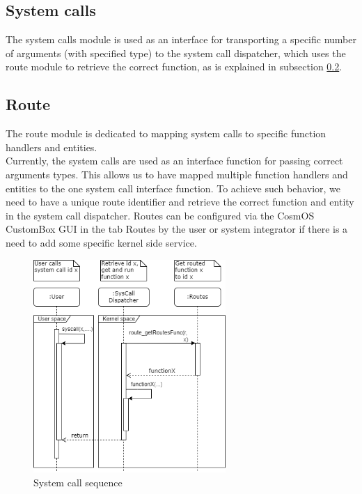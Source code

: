 \subsection{System calls}
The system calls module is used as an interface for transporting a specific number of arguments (with specified type) to the system call dispatcher, which uses the route module to retrieve the correct function, as is explained in subsection \ref{Route}.

\subsection{Route}\label{Route}
The route module is dedicated to mapping system calls to specific function handlers and entities.\\
Currently, the system calls are used as an interface function for passing correct arguments types. This allows us to have mapped multiple function handlers and entities to the one system call interface function. To achieve such behavior, we need to have a unique route identifier and retrieve the correct function and entity in the system call dispatcher. Routes can be configured via the CosmOS CustomBox \ac{GUI} in the tab Routes by the user or system integrator if there is a need to add some specific kernel side service.

\begin{figure}[H]
\begin{center}
\includegraphics[width=0.65\textwidth]{images/routes_example.png}
\caption{System call sequence}
\label{fig:SysCallDispatcher}
\end{center}
\end{figure}

